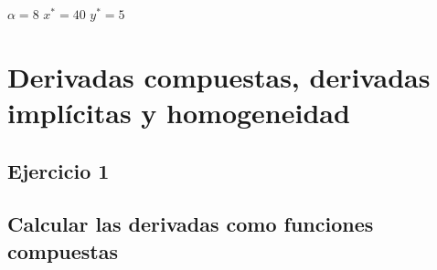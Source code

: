\documentclass{article}
\begin{document}
    {{\color{teal} $\alpha=8$  $x^*=40$  $y^*=5$}}


\newpage



    
\section{Derivadas compuestas, derivadas implícitas y homogeneidad}

\subsection{Ejercicio 1}

\subsection*{Calcular las derivadas como funciones compuestas}
\end{document}
